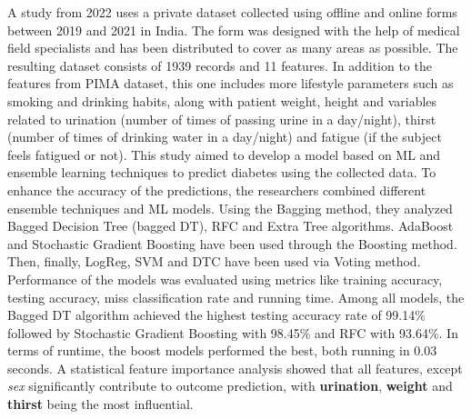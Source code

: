 \documentclass[runningheads]{llncs}
\begin{document}
A study \cite{GANIE2022100092} from 2022 uses a private dataset collected using offline and online forms between 2019 and 2021 in India. The form was designed with the help of medical field specialists and has been distributed to cover as many areas as possible. The resulting dataset consists of 1939 records and 11 features. In addition to the features from PIMA dataset, this one includes more lifestyle parameters such as smoking and drinking habits, along with patient weight, height and variables related to urination (number of times of passing urine in a day/night), thirst (number of times of drinking water in a day/night) and fatigue (if the subject feels fatigued or not). 
This study aimed to develop a model based on ML and ensemble learning techniques to predict diabetes using the collected data.
To enhance the accuracy of the predictions, the researchers combined different ensemble techniques and ML models. Using the Bagging method, they analyzed Bagged Decision Tree (bagged DT), RFC and Extra Tree algorithms. AdaBoost and Stochastic Gradient Boosting have been used through the Boosting method. Then, finally, LogReg, SVM and DTC have been used via Voting method. 
Performance of the models was evaluated using metrics like training accuracy, testing accuracy, miss classification rate and running time. Among all models, the Bagged DT algorithm achieved the highest testing accuracy rate of 99.14\% followed by Stochastic Gradient Boosting with 98.45\% and RFC with 93.64\%. In terms of runtime, the boost models performed the best, both running in 0.03 seconds. A statistical feature importance analysis showed that all features, except \textit{sex} significantly contribute to outcome prediction, with \textbf{urination}, \textbf{weight} and \textbf{thirst} being the most influential. 
\end{document}
